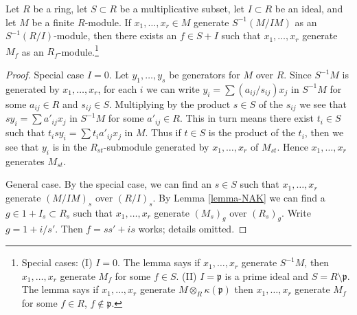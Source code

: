 \begin{lemma}
\label{lemma-NAK-localization}
Let $R$ be a ring, let $S \subset R$ be a multiplicative subset,
let $I \subset R$ be an ideal, and let $M$ be a finite $R$-module.
If $x_1, \ldots, x_r \in M$ generate $S^{-1}(M/IM)$
as an $S^{-1}(R/I)$-module, then there exists an $f \in S + I$
such that $x_1, \ldots, x_r$ generate $M_f$ as an
$R_f$-module.\footnote{Special cases: (I) $I = 0$. The lemma says
if $x_1, \ldots, x_r$ generate $S^{-1}M$, then $x_1, \ldots, x_r$
generate $M_f$ for some $f \in S$. (II) $I = \mathfrak p$ is
a prime ideal and $S = R \setminus \mathfrak p$. The lemma says if
$x_1, \ldots, x_r$ generate $M \otimes_R \kappa(\mathfrak p)$
then $x_1, \ldots, x_r$ generate $M_f$ for some
$f \in R$, $f \not \in \mathfrak p$.}
\end{lemma}

\begin{proof}
Special case $I = 0$. Let $y_1, \ldots, y_s$ be generators for $M$ over $R$.
Since $S^{-1}M$ is generated by $x_1, \ldots, x_r$, for each $i$
we can write $y_i = \sum (a_{ij}/s_{ij})x_j$ in $S^{-1}M$
for some $a_{ij} \in R$ and $s_{ij} \in S$. Multiplying by the product
$s \in S$ of the $s_{ij}$ we see that $sy_i = \sum a'_{ij}x_j$
in $S^{-1}M$ for some $a'_{ij} \in R$.
This in turn means there exist $t_i \in S$ such that
$t_isy_i = \sum t_ia'_{ij}x_j$ in $M$. Thus if $t \in S$
is the product of the $t_i$, then we
see that $y_i$ is in the $R_{st}$-submodule generated by $x_1, \ldots, x_r$
of $M_{st}$. Hence $x_1, \ldots, x_r$ generates $M_{st}$.

\medskip\noindent
General case. By the special case, we can find an $s \in S$
such that $x_1, \ldots, x_r$ generate $(M/IM)_s$ over $(R/I)_s$.
By Lemma \ref{lemma-NAK} we can find a $g \in 1 + I_s \subset R_s$
such that $x_1, \ldots, x_r$ generate $(M_s)_g$ over $(R_s)_g$.
Write $g = 1 + i/s'$. Then $f = ss' + is$ works; details omitted.
\end{proof}